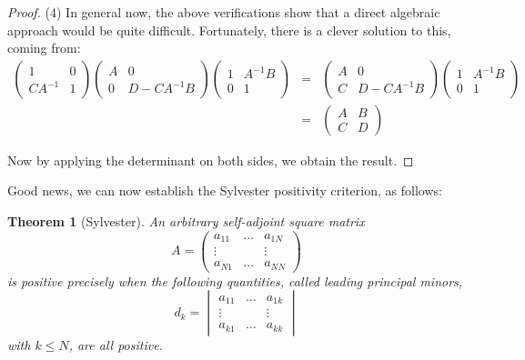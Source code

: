\documentclass[12pt]{amsbook}
\newtheorem{theorem}{Theorem}[chapter]
\begin{document}
\begin{proof}
(4) In general now, the above verifications show that a direct algebraic approach would be quite difficult. Fortunately, there is a clever solution to this, coming from:
\begin{eqnarray*}
\begin{pmatrix}1&0\\CA^{-1}&1\end{pmatrix}
\begin{pmatrix}A&0\\0&D-CA^{-1}B\end{pmatrix}
\begin{pmatrix}1&A^{-1}B\\0&1\end{pmatrix}
&=&\begin{pmatrix}A&0\\C&D-CA^{-1}B\end{pmatrix}
\begin{pmatrix}1&A^{-1}B\\0&1\end{pmatrix}\\
&=&\begin{pmatrix}A&B\\C&D\end{pmatrix}
\end{eqnarray*}

Now by applying the determinant on both sides, we obtain the result.
\end{proof}

Good news, we can now establish the Sylvester positivity criterion, as follows:

\begin{theorem}[Sylvester]
An arbitrary self-adjoint square matrix
$$A=\begin{pmatrix}
a_{11}&\ldots&a_{1N}\\
\vdots&&\vdots\\
a_{N1}&\ldots&a_{NN}\end{pmatrix}$$
is positive precisely when the following quantities, called leading principal minors,
$$d_k=\begin{vmatrix}
a_{11}&\ldots&a_{1k}\\
\vdots&&\vdots\\
a_{k1}&\ldots&a_{kk}\end{vmatrix}$$
with $k\leq N$, are all positive.
\end{theorem}
\end{document}
